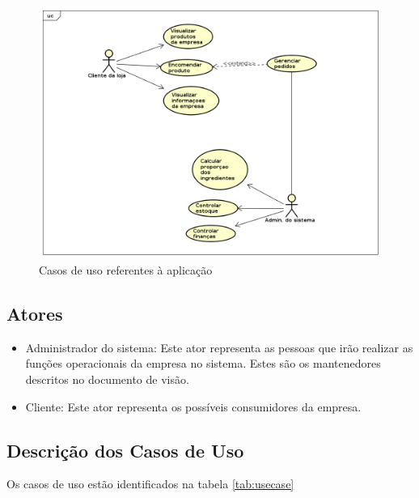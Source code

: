 \begin{figure}[h!]
	\centering
	\includegraphics[scale=0.5]{figuras/usecase.png}
	\caption{Casos de uso referentes à aplicação}
	\label{fig:usecase}
\end{figure}

\subsection{Atores}

\begin{itemize}
	\item Administrador do sistema: Este ator representa as pessoas que irão realizar as funções operacionais da empresa no sistema. Estes são os mantenedores descritos no documento de visão.

	\item Cliente: Este ator representa os possíveis consumidores da empresa.
\end{itemize}

\subsection{Descrição dos Casos de Uso}

Os casos de uso estão identificados na tabela \ref{tab:usecase}

\begin{table}[!h]
\centering
\caption{Casos de uso}
\label{tab:usecase}
\end{table}

